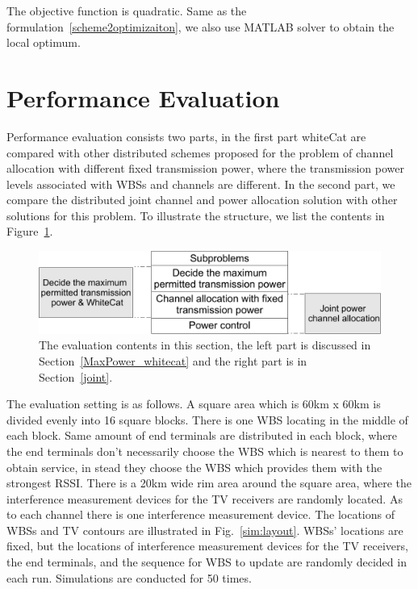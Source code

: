 \documentclass[times]{ettauth}
\theoremstyle{mytheoremstyle}
\theoremstyle{mytheoremstyle}
\theoremstyle{mytheoremstyle}
\begin{document}
The objective function is quadratic.
Same as the formulation~\ref{scheme2optimizaiton}, we also use MATLAB solver to obtain the local optimum.






\section{Performance Evaluation}
\label{simulation}
Performance evaluation consists two parts, in the first part whiteCat are compared with other distributed schemes proposed for the problem of channel allocation with different fixed transmission power, where the transmission power levels associated with WBSs and channels are different.
In the second part, we compare the distributed joint channel and power allocation solution with other solutions for this problem.
To illustrate the structure, we list the contents in Figure~\ref{evaluationContent}.

\begin{figure}[h!]
  \centering
  \includegraphics[width=\linewidth]{evaluation_content.pdf}
  \caption{The evaluation contents in this section, the left part is discussed in Section~\ref{MaxPower_whitecat} and the right part is in Section~\ref{joint}. 	}
\label{evaluationContent}
\end{figure}

The evaluation setting is as follows.
A square area which is 60km x 60km is divided evenly into 16 square blocks.
There is one WBS locating in the middle of each block.
Same amount of end terminals are distributed in each block, where the end terminals don't necessarily choose the WBS which is nearest to them to obtain service, in stead they choose the WBS which provides them with the strongest RSSI.
There is a 20km wide rim area around the square area, where the interference measurement devices for the TV receivers are randomly located.
As to each channel there is one interference measurement device.
The locations of WBSs and TV contours are illustrated in Fig.~\ref{sim:layout}.
WBSs' locations are fixed, but the locations of interference measurement devices for the TV receivers, the end terminals, and the sequence for WBS to update are randomly decided in each run.
Simulations are conducted for 50 times.
\end{document}
